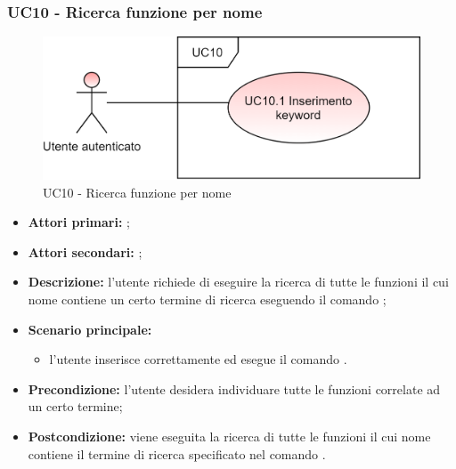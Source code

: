 \subsubsection{UC10 - Ricerca funzione per nome}
\begin{figure}[H]
	\centering
	\includegraphics[scale=\ucs]{./res/img/UC10.png}
	\caption {UC10 - Ricerca funzione per nome}
\end{figure}
\begin{itemize}
	\item \textbf{Attori primari:} \ua{};
	\item \textbf{Attori secondari:} \re{};
	\item \textbf{Descrizione:} l’utente richiede di eseguire la ricerca di tutte le funzioni il cui nome contiene un certo termine di ricerca eseguendo il comando \psearch{};
	\item \textbf{Scenario principale:} 
	\begin{itemize}
		\item l’utente inserisce correttamente ed esegue il comando \psearch{}.
	\end{itemize}
	\item \textbf{Precondizione:} l’utente desidera individuare tutte le funzioni correlate ad un certo termine;
	\item \textbf{Postcondizione:} viene eseguita la ricerca di tutte le funzioni il cui nome contiene il termine di ricerca specificato nel comando \search{}.
\end{itemize}